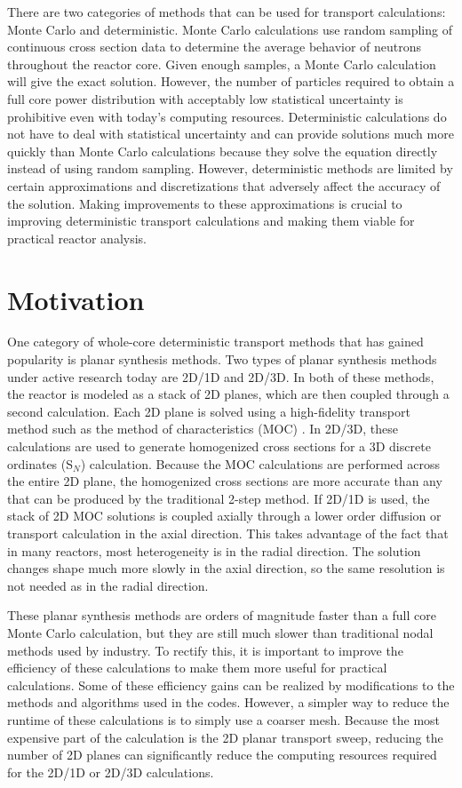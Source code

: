 There are two categories of methods that can be used for transport calculations: Monte Carlo and deterministic.  Monte Carlo calculations use random sampling of continuous cross section data to determine the average behavior of neutrons throughout the reactor core.  Given enough samples, a Monte Carlo calculation will give the exact solution.  However, the number of particles required to obtain a full core power distribution with acceptably low statistical uncertainty is prohibitive even with today's computing resources.  Deterministic calculations do not have to deal with statistical uncertainty and can provide solutions much more quickly than Monte Carlo calculations because they solve the equation directly instead of using random sampling.  However, deterministic methods are limited by certain approximations and discretizations that adversely affect the accuracy of the solution.  Making improvements to these approximations is crucial to improving deterministic transport calculations and making them viable for practical reactor analysis.

\section{Motivation}

One category of whole-core deterministic transport methods that has gained popularity is planar synthesis methods.  Two types of planar synthesis methods under active research today are 2D/1D and 2D/3D.  In both of these methods, the reactor is modeled as a stack of 2D planes, which are then coupled through a second calculation.  Each 2D plane is solved using a high-fidelity transport method such as the method of characteristics (MOC) \cite{HalsallMOCOrigCACTUS1980}.  In 2D/3D, these calculations are used to generate homogenized cross sections for a 3D discrete ordinates (S$_N$) calculation.  Because the MOC calculations are performed across the entire 2D plane, the homogenized cross sections are more accurate than any that can be produced by the traditional 2-step method.  If 2D/1D is used, the stack of 2D MOC solutions is coupled axially through a lower order diffusion or transport calculation in the axial direction.  This takes advantage of the fact that in many reactors, most heterogeneity is in the radial direction.  The solution changes shape much more slowly in the axial direction, so the same resolution is not needed as in the radial direction.

These planar synthesis methods are orders of magnitude faster than a full core Monte Carlo calculation, but they are still much slower than traditional nodal methods used by industry.  To rectify this, it is important to improve the efficiency of these calculations to make them more useful for practical calculations.  Some of these efficiency gains can be realized by modifications to the methods and algorithms used in the codes.  However, a simpler way to reduce the runtime of these calculations is to simply use a coarser mesh.  Because the most expensive part of the calculation is the 2D planar transport sweep, reducing the number of 2D planes can significantly reduce the computing resources required for the 2D/1D or 2D/3D calculations.

